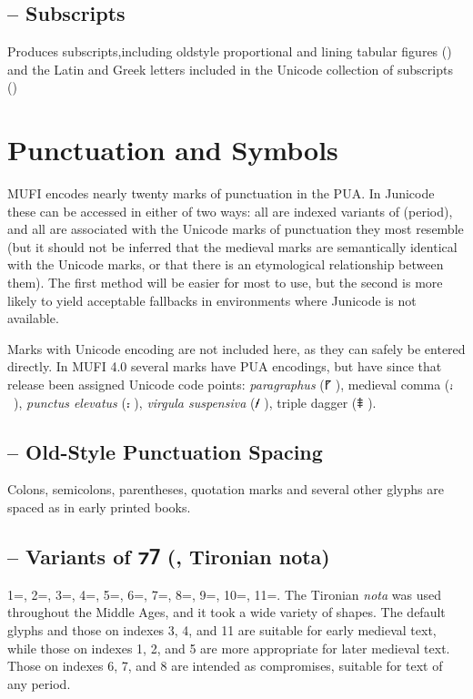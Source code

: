 \subsection{ – Subscripts}
Produces subscripts,including oldstyle proportional and lining tabular figures
() and the Latin and Greek letters included in the Unicode collection of subscripts
()

\section{Punctuation and Symbols}

MUFI encodes nearly twenty marks of punctuation in the PUA. In Junicode these can be accessed in
either of two ways: all are indexed variants of  (period), and all are associated with the Unicode marks of
punctuation they most resemble (but it should not be inferred that the medieval marks are semantically identical with
the Unicode marks, or that there is an etymological relationship between them). The first method will be easier for
most to use, but the second is more likely to yield acceptable fallbacks in environments where Junicode is not
available.

Marks with Unicode encoding are not included here, as they can safely be entered directly. In MUFI 4.0 several marks
have PUA encodings, but have since that release been assigned Unicode code points: \textit{paragraphus} (⹍
), medieval comma (⹌~), \textit{punctus elevatus} (⹎ ), \textit{virgula suspensiva}
(⹊ ), triple dagger (⹋ ).

\subsection{ – Old-Style Punctuation Spacing}
Colons, semicolons, parentheses, quotation marks and several other glyphs are spaced as in early printed books.

\subsection{ – Variants of ⁊⹒
(, Tironian nota)}
1=, 2=, 3=, 4=, 5=,
6=, 7=, 8=, 9=,
10=, 11=. The Tironian \textit{nota} was
used throughout the Middle Ages, and it took a wide variety of shapes. The default glyphs and those
on indexes 3, 4, and 11 are suitable for early medieval text, while those on indexes 1, 2, and 5
are more appropriate for later medieval text. Those on indexes 6, 7, and 8 are intended as
compromises, suitable for text of any period.

